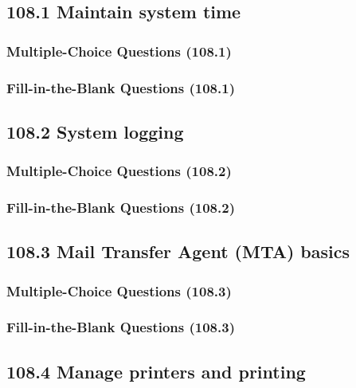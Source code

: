 \documentclass[a4paper]{report}
\begin{document}
\subsection*{108.1 Maintain system time}
\subsubsection*{Multiple-Choice Questions (108.1)}

\subsubsection*{Fill-in-the-Blank Questions (108.1)}

\subsection*{108.2 System logging}
\subsubsection*{Multiple-Choice Questions (108.2)}

\subsubsection*{Fill-in-the-Blank Questions (108.2)}

\subsection*{108.3 Mail Transfer Agent (MTA) basics}
\subsubsection*{Multiple-Choice Questions (108.3)}

\subsubsection*{Fill-in-the-Blank Questions (108.3)}

\subsection*{108.4 Manage printers and printing}
\end{document}
